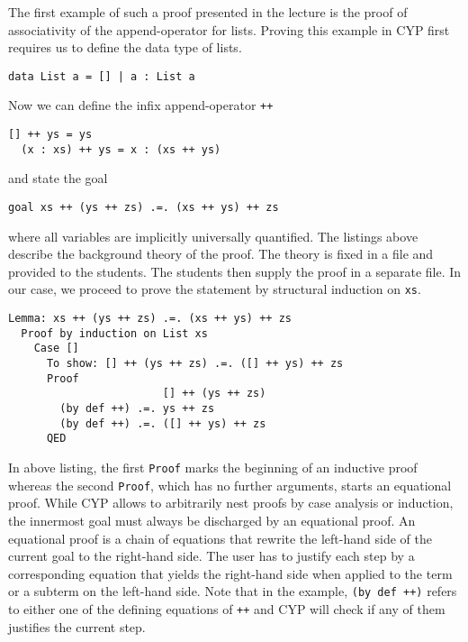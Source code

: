 The first example of such a proof presented in the lecture is the proof of associativity of the append-operator for lists.
Proving this example in CYP first requires us
to define the data type of lists.
\begin{lstlisting}[style=cyp]
  data List a = [] | a : List a
\end{lstlisting}
Now we can define the infix append-operator \lstinline[style=cyp]!++!
\begin{lstlisting}[style=cyp]
  [] ++ ys = ys
  (x : xs) ++ ys = x : (xs ++ ys)
\end{lstlisting}
and state the goal
\begin{lstlisting}[style=cyp]
  goal xs ++ (ys ++ zs) .=. (xs ++ ys) ++ zs
\end{lstlisting}
where all variables are implicitly universally quantified.
The listings above describe the background theory of the proof.
The theory is fixed in a file and provided
to the students.
The students then supply the proof in a separate file.
In our case, we proceed to prove the statement by structural induction on \lstinline[style=cyp]!xs!.
\begin{lstlisting}[style=cyp]
  Lemma: xs ++ (ys ++ zs) .=. (xs ++ ys) ++ zs
  Proof by induction on List xs
    Case []
      To show: [] ++ (ys ++ zs) .=. ([] ++ ys) ++ zs
      Proof
                        [] ++ (ys ++ zs)
        (by def ++) .=. ys ++ zs
        (by def ++) .=. ([] ++ ys) ++ zs
      QED
\end{lstlisting}
In above listing, the first \lstinline[style=cyp]!Proof! marks the beginning of an inductive proof whereas the second \lstinline[style=cyp]!Proof!, which has no further arguments, starts an equational proof.
While CYP allows to arbitrarily nest proofs
by case analysis or induction,
the innermost goal must always be discharged by an equational proof.
An equational proof is a chain of equations that rewrite the left-hand side of the current goal to the right-hand side.
The user has to justify each step by a corresponding equation that yields the right-hand side
when applied to the term or a subterm on the left-hand side.
Note that in the example, \lstinline[style=cyp]!(by def ++)! refers to either one of the defining equations of \lstinline[style=cyp]!++!
and CYP will check if any of them justifies the current step.

